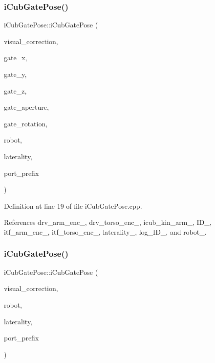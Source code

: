 \subsubsection{\texorpdfstring{i\+Cub\+Gate\+Pose()}{iCubGatePose()}\hspace{0.1cm}{\footnotesize\ttfamily [1/2]}}
{\footnotesize\ttfamily i\+Cub\+Gate\+Pose\+::i\+Cub\+Gate\+Pose (\begin{DoxyParamCaption}\item[{std\+::unique\+\_\+ptr$<$ P\+F\+Visual\+Correction $>$}]{visual\+\_\+correction,  }\item[{const double}]{gate\+\_\+x,  }\item[{const double}]{gate\+\_\+y,  }\item[{const double}]{gate\+\_\+z,  }\item[{const double}]{gate\+\_\+aperture,  }\item[{const double}]{gate\+\_\+rotation,  }\item[{const yarp\+::os\+::\+Const\+String \&}]{robot,  }\item[{const yarp\+::os\+::\+Const\+String \&}]{laterality,  }\item[{const yarp\+::os\+::\+Const\+String \&}]{port\+\_\+prefix }\end{DoxyParamCaption})}



Definition at line 19 of file i\+Cub\+Gate\+Pose.\+cpp.



References drv\+\_\+arm\+\_\+enc\+\_\+, drv\+\_\+torso\+\_\+enc\+\_\+, icub\+\_\+kin\+\_\+arm\+\_\+, I\+D\+\_\+, itf\+\_\+arm\+\_\+enc\+\_\+, itf\+\_\+torso\+\_\+enc\+\_\+, laterality\+\_\+, log\+\_\+\+I\+D\+\_\+, and robot\+\_\+.

\mbox{\label{classiCubGatePose_a6b852c2c3b8c542b33d6b5e129f2ef54}} 
\subsubsection{\texorpdfstring{i\+Cub\+Gate\+Pose()}{iCubGatePose()}\hspace{0.1cm}{\footnotesize\ttfamily [2/2]}}
{\footnotesize\ttfamily i\+Cub\+Gate\+Pose\+::i\+Cub\+Gate\+Pose (\begin{DoxyParamCaption}\item[{std\+::unique\+\_\+ptr$<$ P\+F\+Visual\+Correction $>$}]{visual\+\_\+correction,  }\item[{const yarp\+::os\+::\+Const\+String \&}]{robot,  }\item[{const yarp\+::os\+::\+Const\+String \&}]{laterality,  }\item[{const yarp\+::os\+::\+Const\+String \&}]{port\+\_\+prefix }\end{DoxyParamCaption})}



